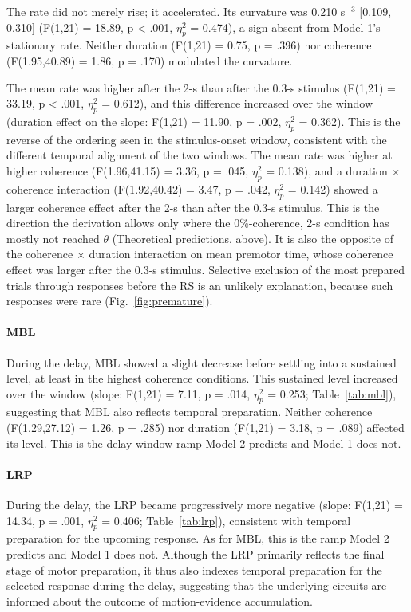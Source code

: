 \documentclass[a4paper,11pt]{article}
\theoremstyle{definition}
\newcommand{\1}{\mathbbm{1}}
\begin{document}
The rate did not merely rise; it accelerated. Its curvature was 0.210 s$^{-3}$ [0.109, 0.310] (F(1,21) = 18.89, p < .001, $\eta_{p}^{2}$ = 0.474), a sign absent from Model 1's stationary rate. Neither duration (F(1,21) = 0.75, p = .396) nor coherence (F(1.95,40.89) = 1.86, p = .170) modulated the curvature.

The mean rate was higher after the 2-s than after the 0.3-s stimulus (F(1,21) = 33.19, p < .001, $\eta_{p}^{2}$ = 0.612), and this difference increased over the window (duration effect on the slope: F(1,21) = 11.90, p = .002, $\eta_{p}^{2}$ = 0.362). This is the reverse of the ordering seen in the stimulus-onset window, consistent with the different temporal alignment of the two windows. The mean rate was higher at higher coherence (F(1.96,41.15) = 3.36, p = .045, $\eta_{p}^{2}$ = 0.138), and a duration $\times$ coherence interaction (F(1.92,40.42) = 3.47, p = .042, $\eta_{p}^{2}$ = 0.142) showed a larger coherence effect after the 2-s than after the 0.3-s stimulus. This is the direction the derivation allows only where the 0\%-coherence, 2-s condition has mostly not reached $\theta$ (Theoretical predictions, above). It is also the opposite of the coherence $\times$ duration interaction on mean premotor time, whose coherence effect was larger after the 0.3-s stimulus. Selective exclusion of the most prepared trials through responses before the RS is an unlikely explanation, because such responses were rare (Fig.~\ref{fig:premature}).

\paragraph{MBL}

During the delay, MBL showed a slight decrease before settling into a sustained level, at least in the highest coherence conditions. This sustained level increased over the window (slope: F(1,21) = 7.11, p = .014, $\eta_{p}^{2}$ = 0.253; Table~\ref{tab:mbl}), suggesting that MBL also reflects temporal preparation. Neither coherence (F(1.29,27.12) = 1.26, p = .285) nor duration (F(1,21) = 3.18, p = .089) affected its level. This is the delay-window ramp Model 2 predicts and Model 1 does not.

\paragraph{LRP}

During the delay, the LRP became progressively more negative (slope: F(1,21) = 14.34, p = .001, $\eta_{p}^{2}$ = 0.406; Table~\ref{tab:lrp}), consistent with temporal preparation for the upcoming response. As for MBL, this is the ramp Model 2 predicts and Model 1 does not. Although the LRP primarily reflects the final stage of motor preparation, it thus also indexes temporal preparation for the selected response during the delay, suggesting that the underlying circuits are informed about the outcome of motion-evidence accumulation.
\end{document}
